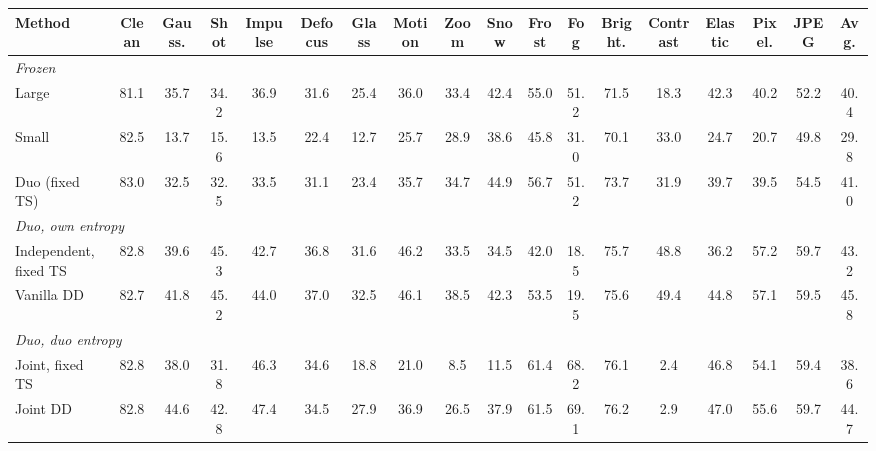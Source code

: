 \begin{table}[t]
{\begin{tabular}{l|c|ccc|cccc|cccc|cccc|c}
        Method & Clean & Gauss. & Shot & Impulse & Defocus & Glass & Motion & Zoom & Snow & Frost & Fog & Bright. & Contrast & Elastic & Pixel. & JPEG & Avg. \\
        \midrule
        \multicolumn{18}{l}{\textit{Frozen}} \\
        \quad Large & 81.1 & 35.7 & 34.2 & 36.9 & 31.6 & 25.4 & 36.0 & 33.4 & 42.4 & 55.0 & 51.2 & 71.5 & 18.3 & 42.3 & 40.2 & 52.2 & 40.4 \\
        \quad Small & 82.5 & 13.7 & 15.6 & 13.5 & 22.4 & 12.7 & 25.7 & 28.9 & 38.6 & 45.8 & 31.0 & 70.1 & 33.0 & 24.7 & 20.7 & 49.8 & 29.8 \\
        \quad Duo (fixed TS) & 83.0 & 32.5 & 32.5 & 33.5 & 31.1 & 23.4 & 35.7 & 34.7 & 44.9 & 56.7 & 51.2 & 73.7 & 31.9 & 39.7 & 39.5 & 54.5 & 41.0 \\
        \midrule
        \multicolumn{18}{l}{\textit{Duo, own entropy}} \\
        \quad Independent, fixed TS & 82.8 & 39.6 & 45.3 & 42.7 & 36.8 & 31.6 & 46.2 & 33.5 & 34.5 & 42.0 & 18.5 & 75.7 & 48.8 & 36.2 & 57.2 & 59.7 & 43.2 \\
        \quad Vanilla DD & 82.7 & 41.8 & 45.2 & 44.0 & 37.0 & 32.5 & 46.1 & 38.5 & 42.3 & 53.5 & 19.5 & 75.6 & 49.4 & 44.8 & 57.1 & 59.5 & 45.8 \\
        \midrule
        \multicolumn{18}{l}{\textit{Duo, duo entropy}} \\
        \quad Joint, fixed TS & 82.8 & 38.0 & 31.8 & 46.3 & 34.6 & 18.8 & 21.0 & 8.5 & 11.5 & 61.4 & 68.2 & 76.1 & 2.4 & 46.8 & 54.1 & 59.4 & 38.6 \\
        \quad Joint DD & 82.8 & 44.6 & 42.8 & 47.4 & 34.5 & 27.9 & 36.9 & 26.5 & 37.9 & 61.5 & 69.1 & 76.2 & 2.9 & 47.0 & 55.6 & 59.7 & 44.7 \\
        \bottomrule
    \end{tabular}%
    }
\end{table}
